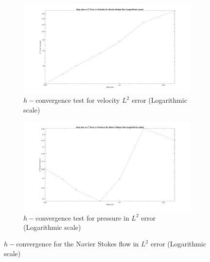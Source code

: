 \documentclass[a4paper,twoside,openright]{book}
\begin{document}
\begin{figure}
\begin{subfigure}{\textwidth}	
  \includegraphics[width=\linewidth]{L2_convergence_velocity_n_s_log.jpg}
  \caption{$h-$convergence test for velocity $L^2$ error (Logarithmic scale)}
  \label{fig:vel_naviers_stoke_conv_log}
\end{subfigure}
\begin{subfigure}{\textwidth}	
  \includegraphics[width=\linewidth]{L2_convergence_pressure_n_s_log.jpg}
  \caption{$h-$convergence test for pressure in $L^2$ error (Logarithmic scale)}
  \label{fig:pre_navier_stoke_conv_log}
\end{subfigure}
\caption{$h-$convergence for the Navier Stokes flow in $L^2$ error (Logarithmic scale)}
\label{navier_stoke_conv_l2_log}
\end{figure}
\end{document}
